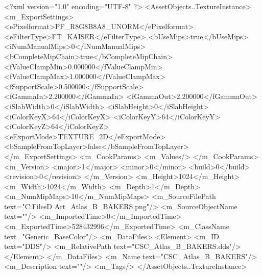 <?xml version="1.0" encoding="UTF-8" ?>
<AssetObjects..TextureInstance>
	<m_ExportSettings>
		<ePixelformat>PF_R8G8B8A8_UNORM</ePixelformat>
		<eFilterType>FT_KAISER</eFilterType>
		<bUseMips>true</bUseMips>
		<iNumManualMips>0</iNumManualMips>
		<bCompleteMipChain>true</bCompleteMipChain>
		<fValueClampMin>0.000000</fValueClampMin>
		<fValueClampMax>1.000000</fValueClampMax>
		<fSupportScale>0.500000</fSupportScale>
		<fGammaIn>2.200000</fGammaIn>
		<fGammaOut>2.200000</fGammaOut>
		<iSlabWidth>0</iSlabWidth>
		<iSlabHeight>0</iSlabHeight>
		<iColorKeyX>64</iColorKeyX>
		<iColorKeyY>64</iColorKeyY>
		<iColorKeyZ>64</iColorKeyZ>
		<eExportMode>TEXTURE_2D</eExportMode>
		<bSampleFromTopLayer>false</bSampleFromTopLayer>
	</m_ExportSettings>
	<m_CookParams>
		<m_Values/>
	</m_CookParams>
	<m_Version>
		<major>1</major>
		<minor>0</minor>
		<build>0</build>
		<revision>0</revision>
	</m_Version>
	<m_Height>1024</m_Height>
	<m_Width>1024</m_Width>
	<m_Depth>1</m_Depth>
	<m_NumMipMaps>10</m_NumMipMaps>
	<m_SourceFilePath text="C:\Users\Shadow\Desktop\Working Files\3D Art\Textures\CSC_Atlas_B_BAKERS.png"/>
	<m_SourceObjectName text=""/>
	<m_ImportedTime>0</m_ImportedTime>
	<m_ExportedTime>528432996</m_ExportedTime>
	<m_ClassName text="Generic_BaseColor"/>
	<m_DataFiles>
		<Element>
			<m_ID text="DDS"/>
			<m_RelativePath text="CSC_Atlas_B_BAKERS.dds"/>
		</Element>
	</m_DataFiles>
	<m_Name text="CSC_Atlas_B_BAKERS"/>
	<m_Description text=""/>
	<m_Tags/>
</AssetObjects..TextureInstance>

